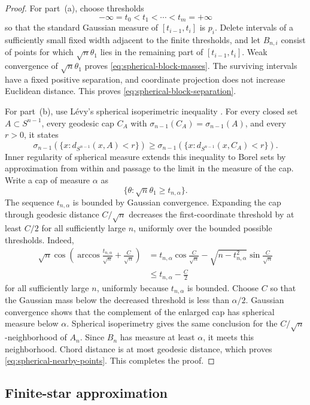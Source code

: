 \documentclass{amsart}
\numberwithin{equation}{section}
\theoremstyle{plain}
\theoremstyle{definition}
\theoremstyle{remark}
\begin{document}
\begin{proof}
For part~\textup{(a)}, choose thresholds
\[ -\infty=t_0<t_1<\cdots<t_m=+\infty \]
so that the standard Gaussian measure of $[t_{i-1},t_i]$ is $p_i$.  Delete intervals of a sufficiently small fixed width adjacent to the finite thresholds, and let $B_{n,i}$ consist of points for which $\sqrt n\theta_1$ lies in the remaining part of $[t_{i-1},t_i]$.  Weak convergence of $\sqrt n\theta_1$ proves \eqref{eq:spherical-block-masses}.  The surviving intervals have a fixed positive separation, and coordinate projection does not increase Euclidean distance.  This proves \eqref{eq:spherical-block-separation}.

For part~\textup{(b)}, use L\'evy's spherical isoperimetric inequality \cite[Theorem~2.3]{shioya2016mmg}.  For every closed set $A\subset S^{n-1}$, every geodesic cap $C_A$ with $\sigma_{n-1}(C_A)=\sigma_{n-1}(A)$, and every $r>0$, it states
\[ \sigma_{n-1}(\{x\colon d_{S^{n-1}}(x,A)<r\})\ge\sigma_{n-1}(\{x\colon d_{S^{n-1}}(x,C_A)<r\}). \]
Inner regularity of spherical measure extends this inequality to Borel sets by approximation from within and passage to the limit in the measure of the cap. Write a cap of measure $\alpha$ as
\[ \{\theta\colon\sqrt n\theta_1\ge t_{n,\alpha}\}. \]
The sequence $t_{n,\alpha}$ is bounded by Gaussian convergence.  Expanding the cap through geodesic distance $C/\sqrt n$ decreases the first-coordinate threshold by at least $C/2$ for all sufficiently large $n$, uniformly over the bounded possible thresholds.  Indeed,
\[
 \begin{aligned}
 \sqrt n\cos\left(\arccos\frac{t_{n,\alpha}}{\sqrt n}+\frac{C}{\sqrt n}\right)
 &=t_{n,\alpha}\cos\frac{C}{\sqrt n}
 -\sqrt{n-t_{n,\alpha}^2}\sin\frac{C}{\sqrt n}\\
 &\le t_{n,\alpha}-\frac C2
 \end{aligned}
\]
for all sufficiently large $n$, uniformly because $t_{n,\alpha}$ is bounded.  Choose $C$ so that the Gaussian mass below the decreased threshold is less than $\alpha/2$.  Gaussian convergence shows that the complement of the enlarged cap has spherical measure below $\alpha$.  Spherical isoperimetry gives the same conclusion for the $C/\sqrt n$-neighborhood of $A_n$.  Since $B_n$ has measure at least $\alpha$, it meets this neighborhood.  Chord distance is at most geodesic distance, which proves \eqref{eq:spherical-nearby-points}.  This completes the proof.
\end{proof}

\subsection{Finite-star approximation}
\end{document}
